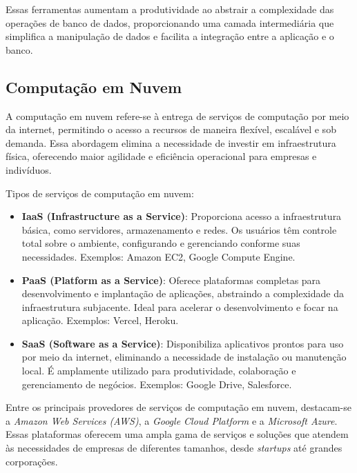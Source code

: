 Essas ferramentas aumentam a produtividade ao abstrair a complexidade das operações de banco de dados, proporcionando uma camada intermediária que simplifica a manipulação de dados e facilita a integração entre a aplicação e o banco.

\subsection{Computação em Nuvem}


A computação em nuvem refere-se à entrega de serviços de computação por meio da internet, permitindo o acesso a recursos de maneira flexível, escalável e sob demanda\cite{what-is-cloud}. Essa abordagem elimina a necessidade de investir em infraestrutura física, oferecendo maior agilidade e eficiência operacional para empresas e indivíduos.

Tipos de serviços de computação em nuvem:

\begin{itemize}
    \item \textbf{IaaS (Infrastructure as a Service)}: Proporciona acesso a infraestrutura básica, como servidores, armazenamento e redes. Os usuários têm controle total sobre o ambiente, configurando e gerenciando conforme suas necessidades. Exemplos: Amazon EC2, Google Compute Engine.
    \item \textbf{PaaS (Platform as a Service)}: Oferece plataformas completas para desenvolvimento e implantação de aplicações, abstraindo a complexidade da infraestrutura subjacente. Ideal para acelerar o desenvolvimento e focar na aplicação. Exemplos: Vercel, Heroku.
    \item \textbf{SaaS (Software as a Service)}: Disponibiliza aplicativos prontos para uso por meio da internet, eliminando a necessidade de instalação ou manutenção local. É amplamente utilizado para produtividade, colaboração e gerenciamento de negócios. Exemplos: Google Drive, Salesforce.
\end{itemize}

Entre os principais provedores de serviços de computação em nuvem, destacam-se a \emph{Amazon Web Services (AWS)}, a \emph{Google Cloud Platform} e a \emph{Microsoft Azure}. Essas plataformas oferecem uma ampla gama de serviços e soluções que atendem às necessidades de empresas de diferentes tamanhos, desde \emph{startups} até grandes corporações.

